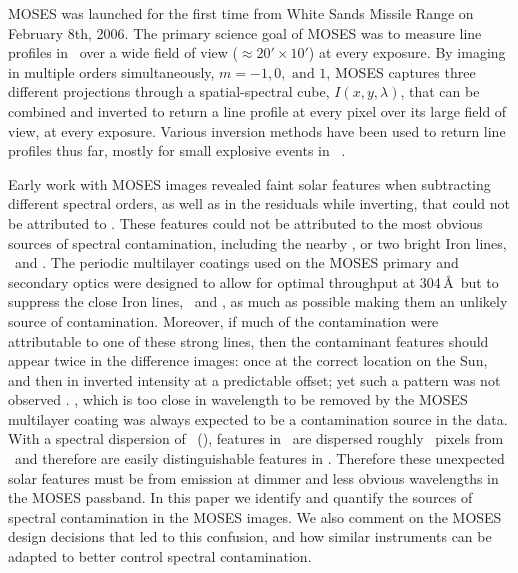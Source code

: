 	MOSES was launched for the first time from White Sands Missile Range on February 8th, 2006.
	The primary science goal of MOSES was to measure line profiles in \heii \ over a wide field of view ($\approx 20' \times 10'$) at every exposure.
	By imaging in multiple orders simultaneously, $m = -1, 0, \text{\ and\ } 1$, MOSES captures three different projections through a spatial-spectral cube, $I(x,y,\lambda)$, that can be combined and inverted to return a line profile at every pixel over its large field of view, at every exposure.
	Various inversion methods have been used to return line profiles thus far, mostly for small explosive events in \heii\ \citep{Fox2010,Fox2011,Courrier2018,Rust2019}.
	
	Early work with MOSES images revealed faint solar features when subtracting different spectral orders, as well as in the residuals while inverting, that could not be attributed to \heii.
	These features could not be attributed to the most obvious sources of spectral contamination, including the nearby \sixi, or two bright Iron lines, \fexv\ and \fexvi.
	The periodic multilayer coatings used on the MOSES primary and secondary optics were designed to allow for optimal throughput at 304\,\AA \ but to suppress the close Iron lines, \fexv\ and \fexvi, as much as possible \citep{Owens2005} making them an unlikely source of contamination.
	Moreover, if much of the contamination were attributable to one of these strong lines, then the contaminant features should appear twice in the difference images: once at the correct location on the Sun, and then in inverted intensity at a predictable offset; yet such a pattern was not observed \citep{Fox2011}.
	\sixi, which is too close in wavelength to be removed by the MOSES multilayer coating was always expected to be a contamination source in the data.
	With a spectral dispersion of \spectdisperspix\ (\spectdispersvel), features in \sixi \ are dispersed roughly \sixipix\ pixels from \heii \ and therefore are easily distinguishable features in \heii.
	Therefore these unexpected solar features must be from emission at dimmer and less obvious wavelengths in the MOSES passband.
	In this paper we identify and quantify the sources of spectral contamination in the MOSES images.
	We also comment on the MOSES design decisions that led to this confusion, and how similar instruments can be adapted to better control spectral contamination.
	
